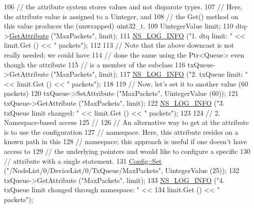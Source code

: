 \begin{DoxyCode}
106   \textcolor{comment}{// the attribute system stores values and not disparate types.}
107   \textcolor{comment}{// Here, the attribute value is assigned to a Uinteger, and}
108   \textcolor{comment}{// the Get() method on this value produces the (unwrapped) uint32\_t.}
109   UintegerValue limit;
110   dtq->\hyperlink{classns3_1_1ObjectBase_a895d1de2f96063d0e0fd78463e7a7e30}{GetAttribute} (\textcolor{stringliteral}{"MaxPackets"}, limit);
111   \hyperlink{group__logging_gafbd73ee2cf9f26b319f49086d8e860fb}{NS\_LOG\_INFO} (\textcolor{stringliteral}{"1.  dtq limit: "} << limit.Get () << \textcolor{stringliteral}{" packets"});
112 
113   \textcolor{comment}{// Note that the above downcast is not really needed; we could have}
114   \textcolor{comment}{// done the same using the Ptr<Queue> even though the attribute}
115   \textcolor{comment}{// is a member of the subclass}
116   txQueue->GetAttribute (\textcolor{stringliteral}{"MaxPackets"}, limit);
117   \hyperlink{group__logging_gafbd73ee2cf9f26b319f49086d8e860fb}{NS\_LOG\_INFO} (\textcolor{stringliteral}{"2.  txQueue limit: "} << limit.Get () << \textcolor{stringliteral}{" packets"});
118 
119   \textcolor{comment}{// Now, let's set it to another value (60 packets)}
120   txQueue->SetAttribute (\textcolor{stringliteral}{"MaxPackets"}, UintegerValue (60));
121   txQueue->GetAttribute (\textcolor{stringliteral}{"MaxPackets"}, limit);
122   \hyperlink{group__logging_gafbd73ee2cf9f26b319f49086d8e860fb}{NS\_LOG\_INFO} (\textcolor{stringliteral}{"3.  txQueue limit changed: "} << limit.Get () << \textcolor{stringliteral}{" packets"});
123 
124   \textcolor{comment}{// 2.  Namespace-based access}
125   \textcolor{comment}{//}
126   \textcolor{comment}{// An alternative way to get at the attribute is to use the configuration}
127   \textcolor{comment}{// namespace.  Here, this attribute resides on a known path in this}
128   \textcolor{comment}{// namespace; this approach is useful if one doesn't have access to}
129   \textcolor{comment}{// the underlying pointers and would like to configure a specific}
130   \textcolor{comment}{// attribute with a single statement.}
131   \hyperlink{group__config_gadce03667ec621d64ce4aace85d9bcfd0}{Config::Set} (\textcolor{stringliteral}{"/NodeList/0/DeviceList/0/TxQueue/MaxPackets"}, UintegerValue (25));
132   txQueue->GetAttribute (\textcolor{stringliteral}{"MaxPackets"}, limit); 
133   \hyperlink{group__logging_gafbd73ee2cf9f26b319f49086d8e860fb}{NS\_LOG\_INFO} (\textcolor{stringliteral}{"4.  txQueue limit changed through namespace: "} << 
134                limit.Get () << \textcolor{stringliteral}{" packets"});

\end{DoxyCode}
